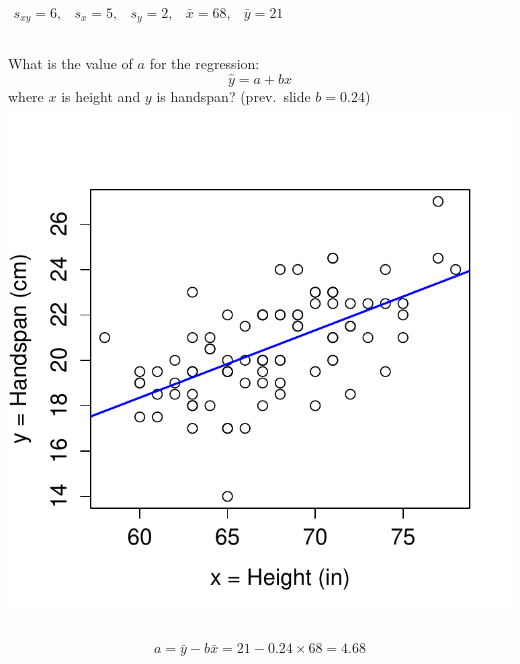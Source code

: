 \documentclass[handout]{beamer}
\begin{document}
\begin{frame}
$\begin{array}{ccccc} s_{xy} = 6,&s_x = 5,& s_y = 2,& \bar{x} = 68,& \bar{y} = 21\end{array}$
\begin{columns}[c]
\column{2.5in}
What is the value of $a$ for the regression: $$\hat{y}=a+bx$$
where $x$ is height and $y$ is handspan? (prev.\ slide $b = 0.24$)
\column{1.8in}
\includegraphics[scale = 0.4]{./images/height_handspan2}
\end{columns}
\alert{$$a = \bar{y} - b \bar{x} = 21 - 0.24 \times 68 = 4.68 $$}
\end{frame}
\end{document}
